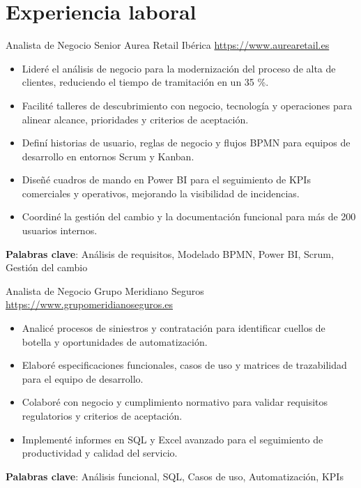 \documentclass[a4paper, serif, 10pt]{moderncv}
\begin{document}
\section{Experiencia laboral}

        {Analista de Negocio Senior}
        {Aurea Retail Ibérica}
        {\url{https://www.aurearetail.es}}
        {}
        {\begin{itemize}
\item Lideré el análisis de negocio para la modernización del proceso de alta de clientes, reduciendo el tiempo de tramitación en un 35 \%.
\item Facilité talleres de descubrimiento con negocio, tecnología y operaciones para alinear alcance, prioridades y criterios de aceptación.
\item Definí historias de usuario, reglas de negocio y flujos BPMN para equipos de desarrollo en entornos Scrum y Kanban.
\item Diseñé cuadros de mando en Power BI para el seguimiento de KPIs comerciales y operativos, mejorando la visibilidad de incidencias.
\item Coordiné la gestión del cambio y la documentación funcional para más de 200 usuarios internos.
\end{itemize}
\textbf{Palabras clave}: Análisis de requisitos, Modelado BPMN, Power BI, Scrum, Gestión del cambio}

        {Analista de Negocio}
        {Grupo Meridiano Seguros}
        {\url{https://www.grupomeridianoseguros.es}}
        {}
        {\begin{itemize}
\item Analicé procesos de siniestros y contratación para identificar cuellos de botella y oportunidades de automatización.
\item Elaboré especificaciones funcionales, casos de uso y matrices de trazabilidad para el equipo de desarrollo.
\item Colaboré con negocio y cumplimiento normativo para validar requisitos regulatorios y criterios de aceptación.
\item Implementé informes en SQL y Excel avanzado para el seguimiento de productividad y calidad del servicio.
\end{itemize}
\textbf{Palabras clave}: Análisis funcional, SQL, Casos de uso, Automatización, KPIs}
\end{document}
